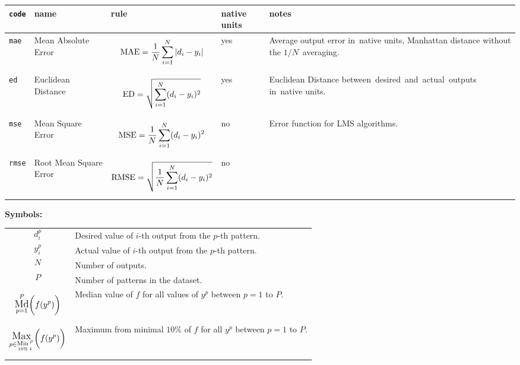 \documentclass{article}
\newcommand*{\md}[3]{{\mathop{\mathlarger{\rm Md}}_{#1=#2}^#3}}
\newcommand*{\maxmin}[4]{{\raisebox{2pt}{$\mathop{\mathlarger{\mathlarger{\rm Max}}}\limits_{{\raisebox{-1pt}{$\scriptstyle #2 \in$}}{\underset{#1\%}{\rm Min}_{\raisebox{2pt}{$\scriptscriptstyle \kern 1pt #3$}}^{\kern 1pt #4}}}$}}}
\begin{document}
\begin{center}
\renewcommand{\arraystretch}{1.5}
\begin{tabular}{M{3em}M{15em}|M{16em}|M{3em}|M{22em}}
 {\tt code} & name & rule & native units & notes \\\hline\hline

 {\tt mae} & Mean Absolute Error & $$ {\rm MAE} = \frac{1}{N} \sum_{i=1}^N |d_i-y_i| $$ & yes & Average output error in~native units,  Manhattan distance without the $1/N$~averaging. \\

 {\tt ed} & Euclidean Distance & $$ {\rm ED} = \sqrt{ \sum_{i=1}^N (d_i-y_i)^2 } $$ & yes & Euclidean Distance between~desired~and~actual~outputs in~native units. \\ 

 {\tt mse} & Mean Square Error & $$ {\rm MSE} = \frac{1}{N} \sum_{i=1}^N (d_i-y_i)^2 $$ & no & Error function for LMS algorithms. \\

 {\tt rmse} & Root Mean Square Error & $$ {\rm RMSE} = \sqrt{ \frac{1}{N} \sum_{i=1}^N (d_i-y_i)^2 } $$ & no & \\

\end{tabular}
\end{center}
\newpage


{\Large\bf Symbols:}
\bigskip
\bigskip
\bigskip

\begin{center}
\renewcommand{\arraystretch}{0.1}
\begin{tabular}{M{12em}R{38em}}

  $$ d_i^p $$ & Desired value of $i$-th output from the $p$-th pattern. \\

  $$ y_i^p $$ & Actual value of $i$-th output from the $p$-th pattern. \\

  $$ N $$ & Number of outputs. \\

  $$ P $$ & Number of patterns in the dataset. \\
  
  $$ \md{p}{1}{P} \bigg( f(y^p) \bigg) $$ & Median value of $f$ for all values of $y^p$ between $p=1$ to $P$. \\

  $$ \maxmin{10}{p}{1}{P} \bigg( f(y^p) \bigg) $$ & Maximum from minimal $10\%$ of $f$ for all $y^p$ between $p=1$ to $P$. \\

\end{tabular}
\end{center}
\newpage
\end{document}
